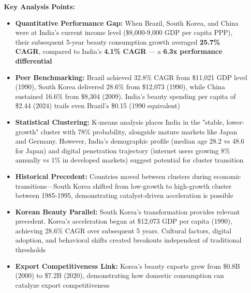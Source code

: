 \documentclass[11pt]{article}
\begin{document}
\textbf{Key Analysis Points:}
\vspace{-5pt}
\begin{itemize}
    \setlength{\itemsep}{-2pt}
    \item \textbf{Quantitative Performance Gap:} When Brazil, South Korea, and China were at India's current income level (\$8,000-9,000 GDP per capita PPP), their subsequent 5-year beauty consumption growth averaged \textbf{25.7\% CAGR}, compared to India's \textbf{4.1\% CAGR} — a \textbf{6.3x performance differential}
    
    \item \textbf{Peer Benchmarking:} Brazil achieved 32.8\% CAGR from \$11,021 GDP level (1990), South Korea delivered 28.6\% from \$12,073 (1990), while China sustained 16.6\% from \$8,304 (2009). India's beauty spending per capita of \$2.44 (2024) trails even Brazil's \$0.15 (1990 equivalent)
    
    \item \textbf{Statistical Clustering:} K-means analysis places India in the "stable, lower-growth" cluster with 78\% probability, alongside mature markets like Japan and Germany. However, India's demographic profile (median age 28.2 vs 48.6 for Japan) and digital penetration trajectory (internet users growing 8\% annually vs 1\% in developed markets) suggest potential for cluster transition
    
    \item \textbf{Historical Precedent:} Countries moved between clusters during economic transitions—South Korea shifted from low-growth to high-growth cluster between 1985-1995, demonstrating catalyst-driven acceleration is possible
    
    \item \textbf{Korean Beauty Parallel:} South Korea's transformation provides relevant precedent. Korea's acceleration began at \$12,073 GDP per capita (1990), achieving 28.6\% CAGR over subsequent 5 years. Cultural factors, digital adoption, and behavioral shifts created breakouts independent of traditional thresholds
    
    \item \textbf{Export Competitiveness Link:} Korea's beauty exports grew from \$0.8B (2000) to \$7.2B (2020), demonstrating how domestic consumption can catalyze export competitiveness
\end{itemize}
\end{document}
